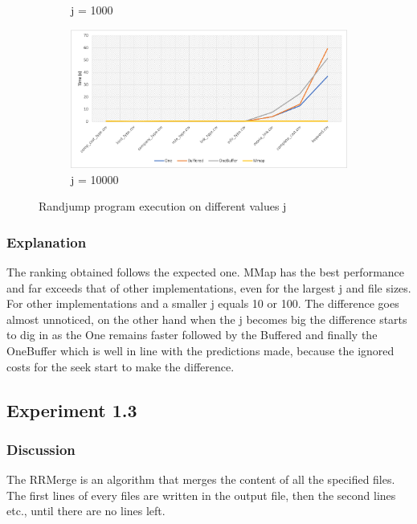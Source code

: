 \documentclass[12pt]{article}
\begin{document}
\begin{figure}[H]
\begin{adjustwidth}{-3.5cm}{-3.5cm}
\begin{subfigure}[b]{0.5\linewidth}
    \caption{j = 1000} 
    \label{fig:4c} 
  \end{subfigure}%
  \begin{subfigure}[b]{0.5\linewidth}
    \centering
    \includegraphics[width=0.99\linewidth]{images/randjump-10000.png} 
    \caption{j = 10000} 
    \label{fig:4d} 
  \end{subfigure} 
  \caption{Randjump program execution on different values j}
  \label{fig:4} 
\end{adjustwidth}
\end{figure}

\subsubsection{Explanation}
The ranking obtained follows the expected one. MMap has the best performance and far exceeds that of other implementations, even for the largest j and file sizes. For other implementations and a smaller j equals 10 or 100. The difference goes almost unnoticed, on the other hand when the j becomes big the difference starts to dig in as the One remains faster followed by the Buffered and finally the OneBuffer which is well in line with the predictions made, because the ignored costs for the seek start to make the difference.


\subsection{Experiment 1.3} \label{exp1.3}

\subsubsection{Discussion}
The RRMerge is an algorithm that merges the content of all the specified files. The first lines of every files are written in the output file, then the second lines etc., until there are no lines left.
\end{document}
